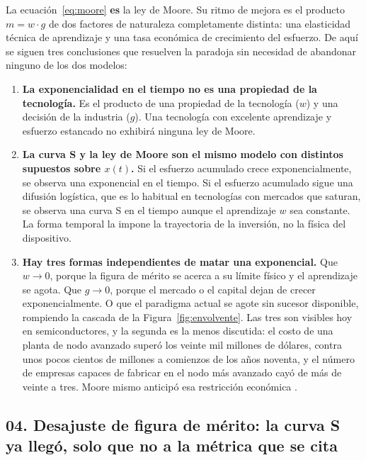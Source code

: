 \documentclass[11pt,letterpaper]{article}
\begin{document}
La ecuación~\eqref{eq:moore} \textbf{es} la ley de Moore. Su ritmo de mejora es
el producto $m = w \cdot g$ de dos factores de naturaleza completamente
distinta: una elasticidad técnica de aprendizaje y una tasa económica de
crecimiento del esfuerzo. De aquí se siguen tres conclusiones que resuelven la
paradoja sin necesidad de abandonar ninguno de los dos modelos:

\begin{enumerate}
  \item \textbf{La exponencialidad en el tiempo no es una propiedad de la
    tecnología.} Es el producto de una propiedad de la tecnología ($w$) y una
    decisión de la industria ($g$). Una tecnología con excelente aprendizaje y
    esfuerzo estancado no exhibirá ninguna ley de Moore.
  \item \textbf{La curva S y la ley de Moore son el mismo modelo con distintos
    supuestos sobre $x(t)$.} Si el esfuerzo acumulado crece exponencialmente, se
    observa una exponencial en el tiempo. Si el esfuerzo acumulado sigue una
    difusión logística, que es lo habitual en tecnologías con mercados que
    saturan, se observa una curva S en el tiempo aunque el aprendizaje $w$ sea
    constante. La forma temporal la impone la trayectoria de la inversión, no la
    física del dispositivo.
  \item \textbf{Hay tres formas independientes de matar una exponencial.} Que
    $w \to 0$, porque la figura de mérito se acerca a su límite físico y el
    aprendizaje se agota. Que $g \to 0$, porque el mercado o el capital dejan de
    crecer exponencialmente. O que el paradigma actual se agote sin sucesor
    disponible, rompiendo la cascada de la Figura~\ref{fig:envolvente}. Las tres
    son visibles hoy en semiconductores, y la segunda es la menos discutida: el
    costo de una planta de nodo avanzado superó los veinte mil millones de
    dólares, contra unos pocos cientos de millones a comienzos de los años
    noventa, y el número de empresas capaces de fabricar en el nodo más avanzado
    cayó de más de veinte a tres. Moore mismo anticipó esa restricción económica
    \parencite{moore1995,waldrop2016}.
\end{enumerate}

\subsection*{04. Desajuste de figura de mérito: la curva S ya llegó, solo que no
a la métrica que se cita}
\end{document}
